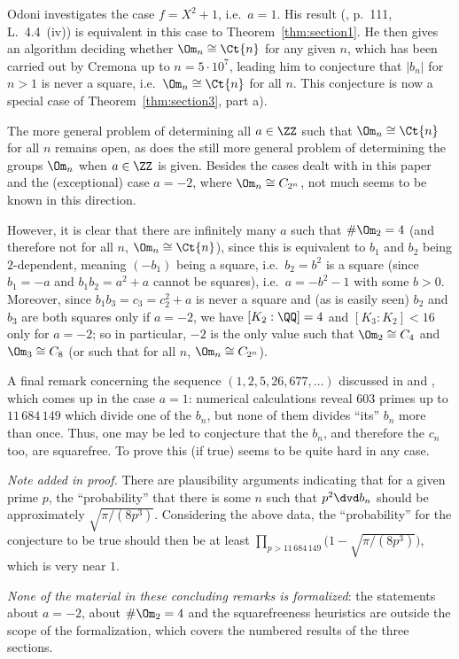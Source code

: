 Odoni \cite{odoni} investigates the case $f = X^2 + 1$, i.e.\ $a = 1$. His result
(\cite{odoni}, p.~111, L.~4.4~(iv)) is equivalent in this case to Theorem~\ref{thm:section1}. He
then gives an algorithm deciding whether $\Om_n \cong \Ct{n}$ for any given $n$, which has been
carried out by Cremona \cite{cremona} up to $n = 5 \cdot 10^7$, leading him to conjecture that
$|b_n|$ for $n > 1$ is never a square, i.e.\ $\Om_n \cong \Ct{n}$ for all $n$. This conjecture is
now a special case of Theorem~\ref{thm:section3}, part a).

The more general problem of determining all $a \in \ZZ$ such that $\Om_n \cong \Ct{n}$ for all
$n$ remains open, as does the still more general problem of determining the groups $\Om_n$ when
$a \in \ZZ$ is given. Besides the cases dealt with in this paper and the (exceptional) case
$a = -2$, where $\Om_n \cong C_{2^n}$, not much seems to be known in this direction.

However, it is clear that there are infinitely many $a$ such that $\#\Om_2 = 4$ (and therefore
not for all $n$, $\Om_n \cong \Ct{n}$), since this is equivalent to $b_1$ and $b_2$ being
$2$-dependent, meaning $(-b_1)$ being a square, i.e.\ $b_2 = b^2$ is a square (since $b_1 = -a$
and $b_1 b_2 = a^2 + a$ cannot be squares), i.e.\ $a = -b^2 - 1$ with some $b > 0$. Moreover,
since $b_1 b_3 = c_3 = c_2^2 + a$ is never a square and (as is easily seen) $b_2$ and $b_3$ are
both squares only if $a = -2$, we have $[K_2 : \QQ] = 4$ and $[K_3 : K_2] < 16$ only for
$a = -2$; so in particular, $-2$ is the only value such that $\Om_2 \cong C_4$ and
$\Om_3 \cong C_8$ (or such that for all $n$, $\Om_n \cong C_{2^n}$).

A final remark concerning the sequence $(1, 2, 5, 26, 677, \dots)$ discussed in \cite{cremona}
and \cite{odoni}, which comes up in the case $a = 1$: numerical calculations reveal $603$ primes
up to $11\,684\,149$ which divide one of the $b_n$, but none of them divides ``its'' $b_n$ more
than once. Thus, one may be led to conjecture that the $b_n$, and therefore the $c_n$ too, are
squarefree. To prove this (if true) seems to be quite hard in any case.

\emph{Note added in proof.} There are plausibility arguments indicating that for a given prime
$p$, the ``probability'' that there is some $n$ such that $p^2 \dvd b_n$ should be approximately
$\sqrt{\pi/(8p^3)}$. Considering the above data, the ``probability'' for the conjecture to be
true should then be at least $\prod_{p > 11\,684\,149} \bigl(1 - \sqrt{\pi/(8p^3)}\bigr)$, which
is very near $1$.

\emph{None of the material in these concluding remarks is formalized}: the statements about
$a = -2$, about $\#\Om_2 = 4$ and the squarefreeness heuristics are outside the scope of the
formalization, which covers the numbered results of the three sections.

